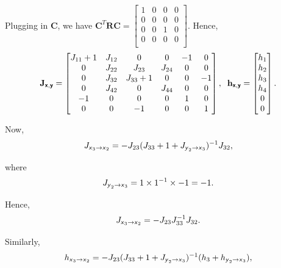 \documentclass{article}
\newcommand{\s}[1]{\textsf{\textit{#1}}}
\newcommand{\bs}[1]{\textsf{\textbf{#1}}}
\newcommand{\bm}{\mathbf}
\begin{document}
Plugging in $\bm{C}$, we have $\bm{C}^T\bm{R}\bm{C} = 
\begin{bmatrix}
    1 & 0 & 0 & 0 \\
    0 & 0 & 0 & 0 \\
    0 & 0 & 1 & 0 \\
    0 & 0 & 0 & 0 \\
\end{bmatrix}$. Hence, 
\begin{align*}
\bm{J}_{\bs{x}, \bs{y}} =
\begin{bmatrix}
    J_{11} + 1 & J_{12} & 0 & 0 & -1 & 0\\
    0 & J_{22} & J_{23} & J_{24} & 0 & 0 \\
    0 & J_{32} & J_{33} + 1 & 0 & 0 & -1 \\
    0 & J_{42} & 0 & J_{44} & 0 & 0 \\
    -1 & 0 & 0 & 0 & 1 & 0 \\
    0 & 0 & -1 & 0 & 0 & 1
\end{bmatrix}, \;\;
\bm{h}_{\bs{x}, \bs{y}} = 
\begin{bmatrix}
    h_1 \\
    h_2 \\
    h_3 \\
    h_4 \\
    0 \\
    0\\
\end{bmatrix}.
\end{align*}

Now,
\begin{align*}
	J_{\s{x}_3\to\s{x}_2} &= -J_{23}(J_{33} + 1 + J_{\s{y}_2\to\s{x}_3})^{-1}J_{32},\\
\end{align*}

where 
\begin{align*}
	J_{\s{y}_2\to\s{x}_3} &= 1\times1^{-1}\times -1 = -1.\\
\end{align*}

Hence, 
\begin{align*}
	J_{\s{x}_3\to\s{x}_2} &= -J_{23}J_{33}^{-1}J_{32}.\\
\end{align*}

Similarly,
\begin{align*}
	h_{\s{x}_3\to\s{x}_2} &= -J_{23}(J_{33} + 1 + J_{\s{y}_2\to\s{x}_3})^{-1}(h_3+h_{\s{y}_2\to\s{x}_3}),\\
\end{align*}
\end{document}

